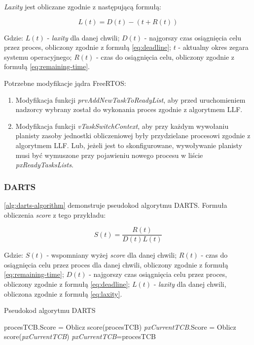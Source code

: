 \documentclass[../../main]{subfiles}
\begin{document}
\textit{Laxity} jest obliczane zgodnie z następującą formułą:

\large
\begin{equation}
    L(t)=D(t)-(t+R(t))
    \label{eq:laxity}
\end{equation}
\normalsize

Gdzie: $L(t)$ - \textit{laxity} dla danej chwili; $D(t)$ - najgorszy czas osiągnięcia celu przez proces, obliczony zgodnie z formułą \eqref{eq:deadline}; $t$ - aktualny okres zegara systemu operacyjnego; $R(t)$ - czas do osiągnięcia celu, obliczony zgodnie z formułą \eqref{eq:remaining-time}.

Potrzebne modyfikacje jądra FreeRTOS:

\begin{enumerate}
    \item Modyfikacja funkcji \textit{prvAddNewTaskToReadyList}, aby przed uruchomieniem nadzorcy wybrany został do wykonania proces zgodnie z algorytmem LLF.
    \item Modyfikacja funkcji \textit{vTaskSwitchContext}, aby przy każdym wywołaniu planisty zasoby jednostki obliczeniowej były przydzielane procesowi zgodnie z algorytmem LLF. Lub, jeżeli jest to skonfigurowane, wywoływanie planisty musi być wymuszone przy pojawieniu nowego procesu w liście \textit{pxReadyTasksLists}. 
\end{enumerate}

\subsubsection{DARTS}

\cref{alg:darts-algorithm} demonstruje pseudokod algorytmu DARTS. Formuła obliczenia \textit{score} z tego przykładu:

\large

\begin{equation}
    S(t) = \frac{R(t)}{D(t)L(t)}
    \label{eq:score}
\end{equation}

\normalsize

Gdzie: $S(t)$ - wspomniany wyżej \textit{score} dla danej chwili; $R(t)$ - czas do osiągnięcia celu przez proces dla danej chwili, obliczony zgodnie z formułą \eqref{eq:remaining-time}; $D(t)$ - najgorszy czas osiągnięcia celu przez proces, obliczony zgodnie z formułą \eqref{eq:deadline}; $L(t)$ - \textit{laxity} dla danej chwili, obliczona zgodnie z formułą \eqref{eq:laxity}.

\begin{algorithm}
\caption{Pseudokod algorytmu DARTS}\label{alg:darts-algorithm}
\begin{algorithmic}[1]
    \State procesTCB.Score = Oblicz score(procesTCB)
    \State \textit{pxCurrentTCB}.Score = Oblicz score(\textit{pxCurrentTCB})
        \State \textit{pxCurrentTCB}=procesTCB
    \EndIf
\EndFor
\end{algorithmic}
\end{algorithm}
\end{document}

